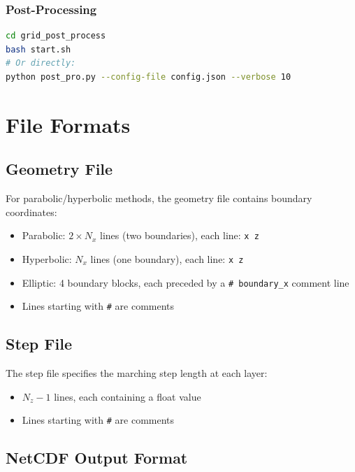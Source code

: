 \documentclass[11pt,a4paper]{report}
\begin{document}
\subsection{Post-Processing}
\begin{lstlisting}[language=bash]
cd grid_post_process
bash start.sh
# Or directly:
python post_pro.py --config-file config.json --verbose 10
\end{lstlisting}

\appendix
\chapter{File Formats}

\section{Geometry File}

For parabolic/hyperbolic methods, the geometry file contains boundary coordinates:
\begin{itemize}
    \item Parabolic: $2 \times N_x$ lines (two boundaries), each line: \texttt{x z}
    \item Hyperbolic: $N_x$ lines (one boundary), each line: \texttt{x z}
    \item Elliptic: 4 boundary blocks, each preceded by a \texttt{\# boundary\_x} comment line
    \item Lines starting with \texttt{\#} are comments
\end{itemize}

\section{Step File}

The step file specifies the marching step length at each layer:
\begin{itemize}
    \item $N_z - 1$ lines, each containing a float value
    \item Lines starting with \texttt{\#} are comments
\end{itemize}

\section{NetCDF Output Format}
\end{document}
